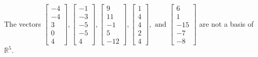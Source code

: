 \begin{exercise}
\begin{exerciseStatement}
  \end{exerciseStatement}
  \begin{exerciseAnswer}
   The vectors \(\left[\begin{array}{r}
-4 \\
-4 \\
3 \\
0 \\
4
\end{array}\right] , \left[\begin{array}{r}
-1 \\
-3 \\
-5 \\
-5 \\
4
\end{array}\right] , \left[\begin{array}{r}
9 \\
11 \\
-1 \\
5 \\
-12
\end{array}\right] , \left[\begin{array}{r}
1 \\
4 \\
4 \\
2 \\
4
\end{array}\right] , \text{ and } \left[\begin{array}{r}
6 \\
1 \\
-15 \\
-7 \\
-8
\end{array}\right]\) 
  	 are not  a basis of \(\mathbb{R}^5\).
  


  \end{exerciseAnswer}
\end{exercise}